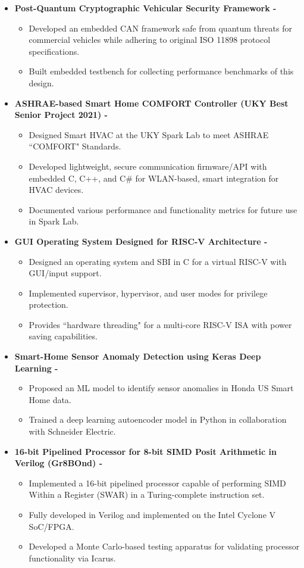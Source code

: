 \documentclass[line,margin,9pt]{res}
\begin{document}
\begin{resume}
\begin{itemize}
\item \textbf{Post-Quantum Cryptographic Vehicular Security Framework -} 
\begin{itemize}
\item Developed an embedded CAN framework safe from quantum threats for commercial vehicles while adhering to original ISO 11898 protocol specifications.
\item Built embedded testbench for collecting performance benchmarks of this design.
\end{itemize}

\item \textbf{ASHRAE-based Smart Home COMFORT Controller (UKY Best Senior Project 2021) -}
\begin{itemize}
\item Designed Smart HVAC at the UKY Spark Lab to meet ASHRAE ``COMFORT" Standards.
\item Developed lightweight, secure communication firmware/API with embedded C, C++, and C\# for WLAN-based, smart integration for HVAC devices.
\item Documented various performance and functionality metrics for future use in Spark Lab.
\end{itemize}

\item \textbf{GUI Operating System Designed for RISC-V Architecture -} 
\begin{itemize}
\item Designed an operating system and SBI in C for a virtual RISC-V with GUI/input support.
\item Implemented supervisor, hypervisor, and user modes for privilege protection.
\item Provides ``hardware threading" for a multi-core RISC-V ISA with power saving capabilities.
\end{itemize}

\item \textbf{Smart-Home Sensor Anomaly Detection using Keras Deep Learning -} 
\begin{itemize}
\item Proposed an ML model to identify sensor anomalies in Honda US Smart Home data.
\item Trained a deep learning autoencoder model in Python in collaboration with Schneider Electric.
\end{itemize}

\item \textbf{16-bit Pipelined Processor for 8-bit SIMD Posit Arithmetic in Verilog (Gr8BOnd) -} 
\begin{itemize}
\item Implemented a 16-bit pipelined processor capable of performing SIMD Within a Register (SWAR) in a Turing-complete instruction set.
\item Fully developed in Verilog and implemented on the Intel Cyclone V SoC/FPGA.
\item Developed a Monte Carlo-based testing apparatus for validating processor functionality via Icarus.
\end{itemize}


\end{itemize}
\end{resume}
\end{document}
